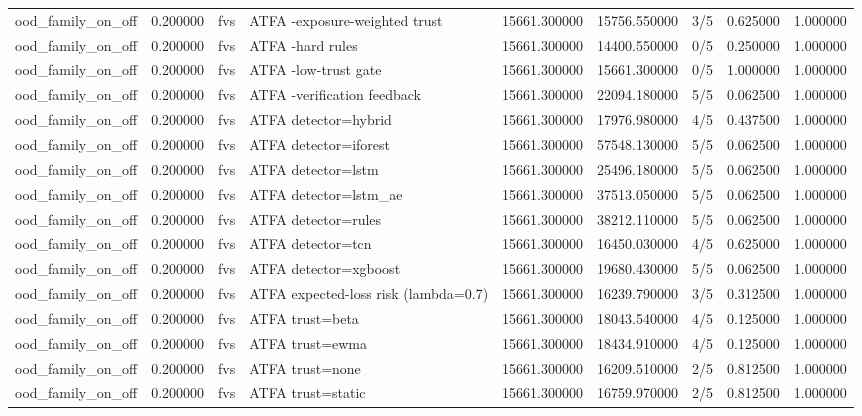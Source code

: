 \begin{tabular}{lrllrrlrr}
ood\_family\_on\_off & 0.200000 & fvs & ATFA -exposure-weighted trust & 15661.300000 & 15756.550000 & 3/5 & 0.625000 & 1.000000 \\
ood\_family\_on\_off & 0.200000 & fvs & ATFA -hard rules & 15661.300000 & 14400.550000 & 0/5 & 0.250000 & 1.000000 \\
ood\_family\_on\_off & 0.200000 & fvs & ATFA -low-trust gate & 15661.300000 & 15661.300000 & 0/5 & 1.000000 & 1.000000 \\
ood\_family\_on\_off & 0.200000 & fvs & ATFA -verification feedback & 15661.300000 & 22094.180000 & 5/5 & 0.062500 & 1.000000 \\
ood\_family\_on\_off & 0.200000 & fvs & ATFA detector=hybrid & 15661.300000 & 17976.980000 & 4/5 & 0.437500 & 1.000000 \\
ood\_family\_on\_off & 0.200000 & fvs & ATFA detector=iforest & 15661.300000 & 57548.130000 & 5/5 & 0.062500 & 1.000000 \\
ood\_family\_on\_off & 0.200000 & fvs & ATFA detector=lstm & 15661.300000 & 25496.180000 & 5/5 & 0.062500 & 1.000000 \\
ood\_family\_on\_off & 0.200000 & fvs & ATFA detector=lstm\_ae & 15661.300000 & 37513.050000 & 5/5 & 0.062500 & 1.000000 \\
ood\_family\_on\_off & 0.200000 & fvs & ATFA detector=rules & 15661.300000 & 38212.110000 & 5/5 & 0.062500 & 1.000000 \\
ood\_family\_on\_off & 0.200000 & fvs & ATFA detector=tcn & 15661.300000 & 16450.030000 & 4/5 & 0.625000 & 1.000000 \\
ood\_family\_on\_off & 0.200000 & fvs & ATFA detector=xgboost & 15661.300000 & 19680.430000 & 5/5 & 0.062500 & 1.000000 \\
ood\_family\_on\_off & 0.200000 & fvs & ATFA expected-loss risk (lambda=0.7) & 15661.300000 & 16239.790000 & 3/5 & 0.312500 & 1.000000 \\
ood\_family\_on\_off & 0.200000 & fvs & ATFA trust=beta & 15661.300000 & 18043.540000 & 4/5 & 0.125000 & 1.000000 \\
ood\_family\_on\_off & 0.200000 & fvs & ATFA trust=ewma & 15661.300000 & 18434.910000 & 4/5 & 0.125000 & 1.000000 \\
ood\_family\_on\_off & 0.200000 & fvs & ATFA trust=none & 15661.300000 & 16209.510000 & 2/5 & 0.812500 & 1.000000 \\
ood\_family\_on\_off & 0.200000 & fvs & ATFA trust=static & 15661.300000 & 16759.970000 & 2/5 & 0.812500 & 1.000000 \\

\end{tabular}
